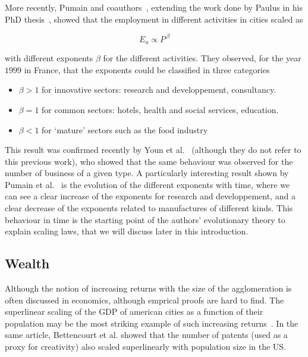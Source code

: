 More recently, Pumain and coauthors~\cite{Pumain:2006}, extending the work done
by Paulus in his PhD thesis~\cite{Paulus:2004}, showed that the
employment in different activities in cities scaled as

\begin{equation}
    E_a \propto P^{\,\beta}
\end{equation}

with different exponents $\beta$ for the different activities. They observed,
for the year $1999$ in France, that the exponents could be classified in three
categories

\begin{itemize}
    \item $\beta > 1$ for innovative sectors: research and developpement,
        consultancy.
    \item $\beta = 1$ for common sectors: hotels, health and social services,
        education.
    \item $\beta < 1$ for `mature' sectors such as the food industry
\end{itemize}

This result was confirmed recently by Youn et al.~\cite{Youn:2014} (although
they do not refer to this previous work), who showed that the same behaviour was
observed for the number of business of a given type. A particularly interesting
result shown by Pumain et al.~\cite{Pumain:2006} is the evolution of the
different exponents with time, where we can see a clear increase of the
exponents for research and developpement, and a clear decrease of the exponents
related to manufactures of different kinds. This behaviour in time is the
starting point of the authors' evolutionary theory to explain scaling laws, that
we will discuss later in this introduction.\\


\subsection{Wealth}
\label{sub:wealth}

Although the notion of increasing returns with the size of the agglomeration is
often discussed in economics, although emprical proofs are hard to find. The
superlinear scaling of the GDP of american cities as a function of their
population may be the most striking example of such increasing
returns~\cite{Bettencourt:2007}. In the same article, Bettencourt et al. showed
that the number of patents (used as a proxy for creativity) also scaled
superlinearly with population size in the US.

